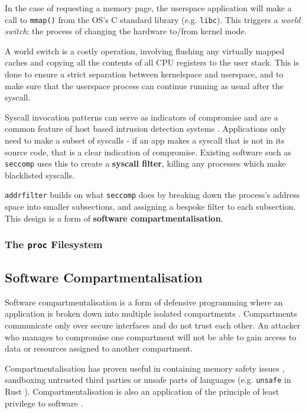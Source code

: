 In the case of requesting a memory page, the userspace application will make a
call to \texttt{mmap()} from the \ac{OS}'s C standard library (e.g. \texttt{libc}).
This triggers a \textit{world switch}: the process of changing the hardware
to/from kernel mode.

A world switch is a costly operation, involving flushing any virtually mapped
caches and copying all the contents of all \ac{CPU} registers to the user stack. This
is done to ensure a strict separation between kernelspace and userspace, and to
make sure that the userspace process can continue running as usual after the
syscall.

Syscall invocation patterns can serve as indicators of compromise
and are a common feature of host based intrusion detection systems \cite{10.1145/3214304}. 
Applications only need to make a subset of syscalls
- if an app makes a syscall that is not in its source code, that is a clear
indication of compromise. Existing software such as \texttt{seccomp} uses this
to create a \textbf{syscall filter}, killing any processes which make
blacklisted syscalls. 

\texttt{addrfilter} builds on what \texttt{seccomp} does by breaking down the
process's address space into smaller subsections, and assigning a bespoke filter
to each subsection. This design is a form of \textbf{software
compartmentalisation}. 

\subsubsection{The \texttt{proc} Filesystem}

\subsection{Software Compartmentalisation}

Software compartmentalisation is a form of defensive programming where an
application is broken down into multiple isolated compartments \cite{SOK}. Compartments
communicate only over secure interfaces and do not trust each other. An attacker
who manages to compromise one compartment will not be able to gain access to
data or resources assigned to another compartment. 

Compartmentalisation has proven useful in containing memory safety issues
\cite{CONFFUZZ},
sandboxing untrusted third parties \cite{ANDROID_SOK} or unsafe parts of
languages \cite{MPK} (e.g.
\texttt{unsafe} in Rust \cite{rustbook_unsafe}). Compartmentalisation is also an
application of the principle of least privilege to software \cite{PRIVMAN}.

